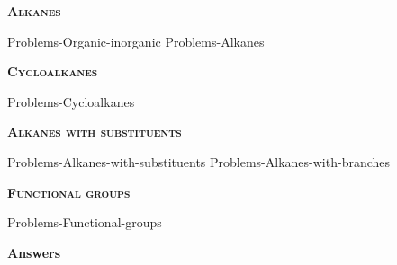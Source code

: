 \documentclass[main.tex]{subfiles}
\newcommand\chapterlabel{Ch-orgo}
\begin{document}
\newpage
\setdoublesep{0.35700 em}  %
\setatomsep{1.78500 em}    %
\setbondoffset{0.18265 em} %
\newcommand{\bondwidth}{0.06642 em} %
\setbondstyle{line width = \bondwidth}
\fancyhfoffset[E,O]{0pt}
\setlength{\columnsep}{30pt}
\begin{conclusion}
\end{conclusion}
\begin{multicols*}{2}\setcounter{numA}{1}  %







{\raggedright\textsc{\textbf{Alkanes}}\par}
{Problems-Organic-inorganic}
{Problems-Alkanes}
 {\raggedright\textsc{\textbf{Cycloalkanes}}\par}
{Problems-Cycloalkanes}
{\raggedright\textsc{\textbf{Alkanes with substituents}}\par}
{Problems-Alkanes-with-substituents}
{Problems-Alkanes-with-branches}  
{\raggedright\textsc{\textbf{Functional groups}}\par}
{Problems-Functional-groups}

\end{multicols*}
\newpage
\begin{answersenvironment}
\begin{minipage}[c]{1\textwidth}
\begin{localsize}{10}
{\Large \bf Answers}
\printsolutions 
\end{localsize}
\end{minipage}\end{answersenvironment}
\end{document}
